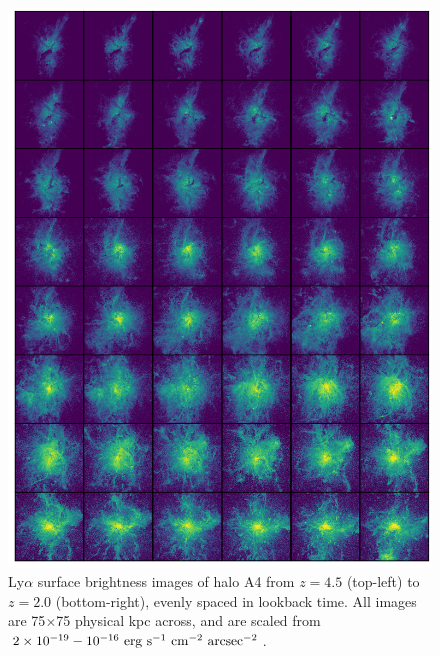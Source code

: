 \begin{figure}
    \centering
    \includegraphics[width=\textwidth,keepaspectratio]{figures/rogues_A4.png}
    \caption{
        Ly$\alpha$ surface brightness images of halo A4 from $z=4.5$ (top-left) to $z=2.0$ (bottom-right), evenly spaced in lookback time.
        All images are 75$\times$75 physical kpc across, and are scaled from $2\times10^{-19}-10^{-16}\ \rm{erg}\ \rm{s}^{-1}\ \rm{cm}^{-2}\ \rm{arcsec}^{-2}$.
    }
  \label{fig:rogues4}
\end{figure}

